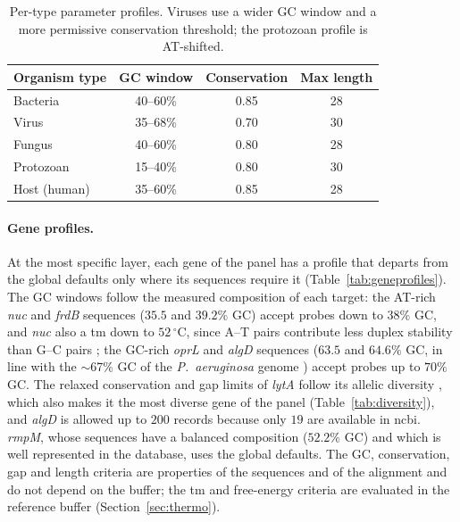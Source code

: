 \begin{table}[H]
\begin{center}
\begin{tabular}{l c c c}
\hline
\textbf{Organism type} & \textbf{GC window} & \textbf{Conservation} & \textbf{Max length} \\
\hline
Bacteria    & 40--60\% & 0.85 & 28 \\
Virus       & 35--68\% & 0.70 & 30 \\
Fungus      & 40--60\% & 0.80 & 28 \\
Protozoan   & 15--40\% & 0.80 & 30 \\
Host (human)& 35--60\% & 0.85 & 28 \\
\hline
\end{tabular}
\end{center}
\caption{Per-type parameter profiles. Viruses use a wider GC window and a more permissive conservation
threshold; the protozoan profile is AT-shifted.}
\label{tab:types}
\end{table}

\paragraph{Gene profiles.} At the most specific layer, each gene of the panel has a profile that departs
from the global defaults only where its sequences require it (Table~\ref{tab:geneprofiles}). The GC
windows follow the measured composition of each target: the AT-rich \emph{nuc} and \emph{frdB} sequences
($35.5$ and $39.2\%$ GC) accept probes down to $38\%$ GC, and \emph{nuc} also a \acrshort{tm} down to
$52\,^{\circ}$C, since A--T pairs contribute less duplex stability than G--C pairs \citep{santalucia2004};
the GC-rich \emph{oprL} and \emph{algD} sequences ($63.5$ and $64.6\%$ GC, in line with the $\sim$67\%
GC of the \emph{P.\ aeruginosa} genome \citep{stover2000}) accept probes up to $70\%$ GC. The relaxed
conservation and gap limits of \emph{lytA} follow its allelic diversity \citep{obregon2002}, which also
makes it the most diverse gene of the panel (Table~\ref{tab:diversity}), and \emph{algD} is allowed up to
$200$ records because only $19$ are available in \acrshort{ncbi}. \emph{rmpM}, whose sequences have a
balanced composition ($52.2\%$ GC) and which is well represented in the database, uses the global
defaults. The GC, conservation, gap and length criteria are properties of the sequences and of the
alignment and do not depend on the buffer; the \acrshort{tm} and free-energy criteria are evaluated in
the reference buffer (Section~\ref{sec:thermo}).

